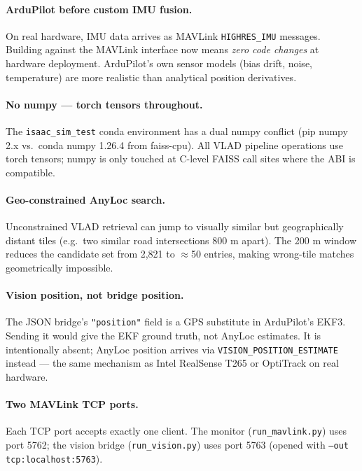 \documentclass[11pt,a4paper]{article}
\begin{document}
\paragraph{ArduPilot before custom IMU fusion.}
On real hardware, IMU data arrives as MAVLink \texttt{HIGHRES\_IMU} messages.  Building against
the MAVLink interface now means \textit{zero code changes} at hardware deployment.
ArduPilot's own sensor models (bias drift, noise, temperature) are more realistic than
analytical position derivatives.

\paragraph{No numpy --- torch tensors throughout.}
The \texttt{isaac\_sim\_test} conda environment has a dual numpy conflict
(pip numpy 2.x vs.\ conda numpy 1.26.4 from faiss-cpu).  All VLAD pipeline operations use
torch tensors; numpy is only touched at C-level FAISS call sites where the ABI is compatible.

\paragraph{Geo-constrained AnyLoc search.}
Unconstrained VLAD retrieval can jump to visually similar but geographically distant tiles
(e.g.\ two similar road intersections 800 m apart).  The 200 m window reduces the candidate
set from 2,821 to $\approx$50 entries, making wrong-tile matches geometrically impossible.

\paragraph{Vision position, not bridge position.}
The JSON bridge's \texttt{"position"} field is a GPS substitute in ArduPilot's EKF3.
Sending it would give the EKF ground truth, not AnyLoc estimates.  It is intentionally
absent; AnyLoc position arrives via \texttt{VISION\_POSITION\_ESTIMATE} instead
--- the same mechanism as Intel RealSense T265 or OptiTrack on real hardware.

\paragraph{Two MAVLink TCP ports.}
Each TCP port accepts exactly one client.  The monitor (\texttt{run\_mavlink.py}) uses port 5762;
the vision bridge (\texttt{run\_vision.py}) uses port 5763 (opened with \texttt{--out tcp:localhost:5763}).

\end{document}
